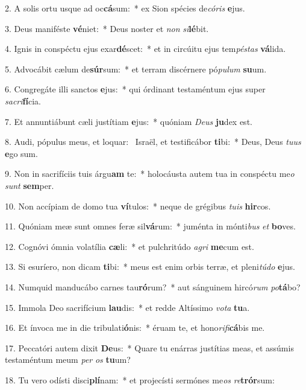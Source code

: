 2. A solis ortu usque ad oc\textbf{cá}sum:~*  ex Sion spécies de\textit{có}\textit{ris} \textbf{e}jus.\

3. Deus maniféste \textbf{vé}niet:~*  Deus noster et \textit{non} \textit{si}\textbf{lé}bit.\

4. Ignis in conspéctu ejus exar\textbf{dé}scet:~*  et in circúitu ejus tem\textit{pés}\textit{tas} \textbf{vá}lida.\

5. Advocábit cælum de\textbf{súr}sum:~*  et terram discérnere pó\textit{pu}\textit{lum} \textbf{su}um.\

6. Congregáte illi sanctos \textbf{e}jus:~*  qui órdinant testaméntum ejus super \textit{sa}\textit{cri}\textbf{fí}cia.\

7. Et annuntiábunt cæli justítiam \textbf{e}jus:~*  quóniam \textit{De}\textit{us} \textbf{ju}dex est.\

8. Audi, pópulus meus, et loquar: \dag\  Israël, et testificábor \textbf{ti}bi:~*  Deus, Deus \textit{tu}\textit{us} \textbf{e}go sum.\

9. Non in sacrifíciis tuis árgu\textbf{am} te:~*  holocáusta autem tua in conspéctu me\textit{o} \textit{sunt} \textbf{sem}per.\

10. Non accípiam de domo tua \textbf{ví}tulos:~*  neque de grégibus \textit{tu}\textit{is} \textbf{hir}cos.\

11. Quóniam meæ sunt omnes feræ sil\textbf{vá}rum:~*  juménta in mónti\textit{bus} \textit{et} \textbf{bo}ves.\

12. Cognóvi ómnia volatília \textbf{cæ}li:~*  et pulchritúdo \textit{a}\textit{gri} \textbf{me}cum est.\

13. Si esuríero, non dicam \textbf{ti}bi:~*  meus est enim orbis terræ, et pleni\textit{tú}\textit{do} \textbf{e}jus.\

14. Numquid manducábo carnes tau\textbf{ró}rum?~*  aut sánguinem hircó\textit{rum} \textit{po}\textbf{tá}bo?\

15. Immola Deo sacrifícium \textbf{lau}dis:~*  et redde Altíssimo \textit{vo}\textit{ta} \textbf{tu}a.\

16. Et ínvoca me in die tribulati\textbf{ó}nis:~*  éruam te, et hono\textit{ri}\textit{fi}\textbf{cá}bis me.\

17. Peccatóri autem dixit \textbf{De}us:~*  Quare tu enárras justítias meas, et assúmis testaméntum meum \textit{per} \textit{os} \textbf{tu}um?\

18. Tu vero odísti disci\textbf{plí}nam:~*  et projecísti sermónes me\textit{os} \textit{re}\textbf{trór}sum:\

